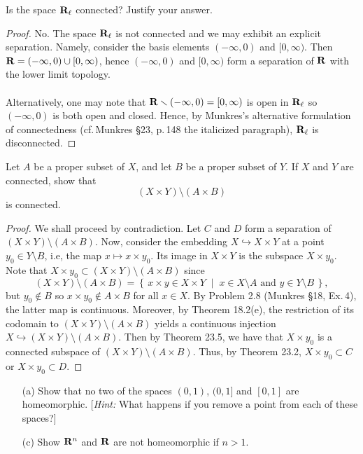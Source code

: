 \begin{problem}[Munkres \S23, Ex.\,7]
Is the space $\mathbf{R}_\ell$ connected? Justify your answer.
\end{problem}
\begin{proof}
No. The space $\mathbf{R}_\ell$ is not connected and we may exhibit an
explicit separation. Namely, consider the basis elements
$(-\infty,0)$ and $[0,\infty)$. Then
$\mathbf{R}=(-\infty,0)\cup[0,\infty)$, hence $(-\infty,0)$ and
$[0,\infty)$ form a separation of $\mathbf{R}$ with the lower limit
topology.
\\\\
Alternatively, one may note that
$\mathbf{R}\smallsetminus(-\infty,0)=[0,\infty)$ is open in $\mathbf{R}_\ell$ so
$(-\infty,0)$ is both open and closed. Hence, by Munkres's
alternative formulation of connectedness (cf.\,Munkres \S23,
p.\,148 the italicized paragraph), $\mathbf{R}_\ell$ is disconnected.
\end{proof}
\newpage
\begin{problem}[Munkres \S23, Ex.\,9]
Let $A$ be a proper subset of $X$, and let $B$ be a proper subset
of $Y$. If $X$ and $Y$ are connected, show that
\[
(X\times Y)\setminus(A\times B)
\]
is connected.
\end{problem}
\begin{proof}
We shall proceed by contradiction. Let $C$ and $D$ form a
separation of $(X\times Y)\setminus (A\times B)$. Now, consider
the embedding $X\hookrightarrow X\times Y$ at a point $y_0\in
Y\setminus B$, i.e, the map $x\mapsto x\times y_0$. Its image in
$X\times Y$ is the subspace $X\times y_0$. Note that $X\times
y_0\subset(X\times Y)\setminus(A\times B)$ since
\[
(X\times Y)\setminus(A\times B)=\left\{\,x\times y\in X\times
 Y\;\middle|\;\text{$x\in X\setminus A$ and $y\in Y\setminus
 B$}\,\right\},
\]
but $y_0\notin B$ so $x\times y_0\notin A\times B$ for all $x\in
X$. By Problem 2.8 (Munkres \S18, Ex.\,4), the latter map is
continuous. Moreover, by Theorem 18.2(e), the restriction of its
codomain to $(X\times Y)\setminus (A\times B)$ yields a continuous
injection $X\hookrightarrow (X\times Y)\setminus(A\times
B)$. Then by Theorem 23.5, we have that $X\times y_0$ is a
connected subspace of $(X\times Y)\setminus(A\times B)$. Thus, by
Theorem 23.2, $X\times y_0\subset C$ or $X\times y_0\subset D$.
\end{proof}
\newpage
\begin{problem}[Munkres \S24, Ex.\,1(ac)]
\begin{enumerate}[noitemsep]
\item[(a)] Show that no two of the spaces $(0,1)$, $(0,1]$ and
  $[0,1]$ are homeomorphic. [\emph{Hint:} What happens if you
  remove a point from each of these spaces?]
\item[(c)] Show $\mathbf{R}^n$ and $\mathbf{R}$ are not homeomorphic if $n>1$.
\end{enumerate}
\end{problem}
